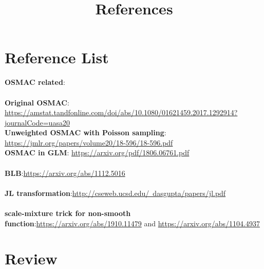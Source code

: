 \documentclass[]{article}
\title{References}
\begin{document}
\maketitle

\section{Reference List}

\textbf{{\large OSMAC related}}:\\
\\
\textbf{Original OSMAC}:  \href{url}{https://amstat.tandfonline.com/doi/abs/10.1080/01621459.2017.1292914?journalCode=uasa20}\\
\textbf{Unweighted OSMAC with Poisson sampling}: 
\href{url}{https://jmlr.org/papers/volume20/18-596/18-596.pdf}\\
\textbf{OSMAC in GLM}: \href{url}{https://arxiv.org/pdf/1806.06761.pdf}\\
\\
\textbf{{\large BLB}}:\href{url}{https://arxiv.org/abs/1112.5016}\\
\\
\textbf{{\large JL transformation}}:\href{url}{http://cseweb.ucsd.edu/~dasgupta/papers/jl.pdf}\\
\\
\textbf{{\large scale-mixture trick for non-smooth function}}:\href{url}{https://arxiv.org/abs/1910.11479} and \href{url}{https://arxiv.org/abs/1104.4937}\\

\section{Review}
\end{document}
